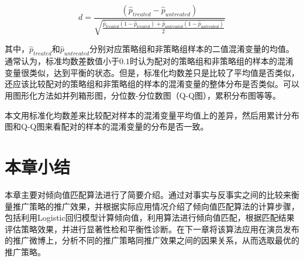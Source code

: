 \begin{equation}d = \frac{(\hat{p}_{treated} - \hat{p}_{untreated})}{\sqrt{\frac{\hat{p}_{treated}(1 - \hat{p}_{treated}) + \hat{p}_{untreated}(1 - \hat{p}_{untreated})}{2}}}\end{equation}

其中，$\hat{p}_{treated}$和$\hat{p}_{untreated}$分别对应策略组和非策略组样本的二值混淆变量的均值。通常认为，标准均数差数值小于$0.1$时认为配对的策略组和非策略组的样本的混淆变量很类似，达到平衡的状态\cite{normand2001validating}。但是，标准化均数差只是比较了平均值是否类似，还应该比较配对的策略组和非策略组的样本的混淆变量的整体分布是否类似。可以用图形化方法如并列箱形图，分位数-分位数图（Q-Q图），累积分布图等等。

本文用标准化均数差来比较配对样本的混淆变量平均值上的差异，然后用累计分布图和Q-Q图来看配对的样本的混淆变量的分布是否一致。

\section{本章小结}

本章主要对倾向值匹配算法进行了简要介绍。通过对事实与反事实之间的比较来衡量推广策略的推广效果，并根据实际应用情况介绍了倾向值匹配算法的计算步骤，包括利用Logistic回归模型计算倾向值，利用算法进行倾向值匹配，根据匹配结果评估策略效果，并进行显著性检和平衡性诊断。在下一章将该算法应用在演员发布的推广微博上，分析不同的推广策略同推广效果之间的因果关系，从而选取最优的推广策略。






















